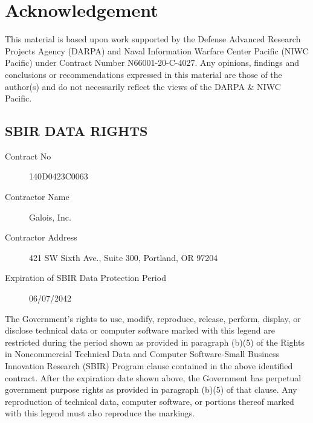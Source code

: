\section{Acknowledgement}

This material is based upon work supported by the Defense Advanced
Research Projects Agency (DARPA) and Naval Information Warfare Center
Pacific (NIWC Pacific) under Contract Number N66001-20-C-4027. Any
opinions, findings and conclusions or recommendations expressed in this
material are those of the author(s) and do not necessarily reflect the
views of the DARPA \& NIWC Pacific.

\subsection*{SBIR DATA RIGHTS}

\begin{description}
\item[Contract No] 140D0423C0063
\item[Contractor Name] Galois, Inc.
\item[Contractor Address] 421 SW Sixth Ave., Suite 300, Portland, OR 97204
\item[Expiration of SBIR Data Protection Period] 06/07/2042
\end{description}

The Government's rights to use, modify, reproduce, release, perform, display, or disclose technical data or computer software marked with this legend are restricted during the period shown as provided in paragraph (b)(5) of the Rights in Noncommercial Technical Data and Computer Software-Small Business Innovation Research (SBIR) Program clause contained in the above identified contract.
After the expiration date shown above, the Government has perpetual government purpose rights as provided in paragraph (b)(5) of that clause.
Any reproduction of technical data, computer software, or portions thereof marked with this legend must also reproduce the markings.

